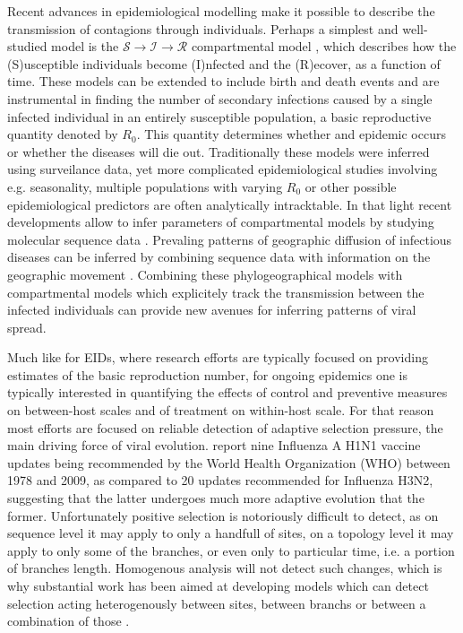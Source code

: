 Recent advances in epidemiological modelling make it possible to describe the transmission of contagions through individuals.
Perhaps a simplest and well-studied model is the ${\mathcal{S} \rightarrow \mathcal{I} \rightarrow \mathcal{R}}$  compartmental model %
, which describes how the (S)usceptible individuals become (I)nfected and the (R)ecover, as a function of time.  
These models can be extended to include birth and death events %
and are instrumental in finding the number of secondary infections caused by a single infected individual in an entirely susceptible population, a basic reproductive quantity denoted by $R_{0}$.
This quantity determines whether and epidemic occurs or whether the diseases will die out.
Traditionally these models were inferred using surveilance data, yet more complicated epidemiological studies involving e.g. seasonality, multiple populations with varying $R_0$ or other possible epidemiological predictors are often analytically intracktable.
In that light recent developments allow to infer parameters of compartmental models by studying molecular sequence data \citep{Volz2009}.
Prevaling patterns of geographic diffusion of infectious diseases can be inferred by combining sequence data with information on the geographic movement \citep{Lemey2009}.
Combining these phylogeographical models with compartmental models which explicitely track the transmission between the infected individuals can provide new avenues for inferring patterns of viral spread.

Much like for EIDs, where research efforts are typically focused on providing estimates of the basic reproduction number, for ongoing epidemics one is typically interested in quantifying the effects of control and preventive measures on between-host scales and of treatment on within-host scale.
For that reason most efforts are focused on reliable detection of adaptive selection pressure, the main driving force of viral evolution.
\cite{Volz2013} report nine Influenza A H1N1 vaccine updates being recommended by the World Health Organization (WHO) between 1978 and 2009, as compared to 20 updates recommended for Influenza H3N2, suggesting that the latter undergoes much more adaptive evolution that the former.
Unfortunately positive selection is notoriously difficult to detect, as on sequence level it may apply to only a handfull of sites, on a topology level it may apply to only some of the branches, or even only to particular time, i.e. a portion of branches length.
Homogenous analysis will not detect such changes, which is why substantial work has been aimed at developing models which can detect selection acting heterogenously between sites, between branchs or between a combination of those \citep{NY98, Pond2005a, Goode2008}.

